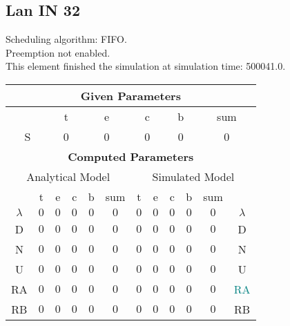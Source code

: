 \documentclass{article}
\begin{document}
\subsection{Lan IN 32}
Scheduling algorithm: FIFO.\\Preemption not enabled. \\This element finished the simulation at simulation time: 500041.0.\\
\begin{table}[H]\centering\begin{tabular}{@{}c|cccc|c||cccc|c|c@{}}\toprule\multicolumn{12}{c}{\textbf{Given Parameters}}\\\midrule\multicolumn{2}{c|}{ } & \multicolumn{2}{c}{t} & \multicolumn{2}{c}{e} & \multicolumn{2}{c}{c} & \multicolumn{2}{c}{b} & \multicolumn{2}{|c}{sum} \\ \midrule\multicolumn{2}{c|}{S} & \multicolumn{2}{c}{0} & \multicolumn{2}{c}{0} & \multicolumn{2}{c}{0} & \multicolumn{2}{c}{0} & \multicolumn{2}{|c}{0}\\ \midrule\midrule\multicolumn{12}{c}{\textbf{Computed Parameters}}\\ \midrule\multicolumn{6}{c||}{Analytical Model} & \multicolumn{6}{c}{Simulated Model}\\ 
 \midrule & t & e & c & b & sum & t & e & c & b & sum &  \\ \midrule$\lambda$ &$0$ & $0$ & $0$ & $0$ & $0$ & $0$ & $0$ & $0$ & $0$ & $0$& $\lambda$ \\D & $0$ & $0$ & $0$ & $0$ & $0$ & $0$ & $0$ & $0$ & $0$ & $0$& D\\N & $0$ & $0$ & $0$ & $0$ & $0$ & $0$ & $0$ & $0$ & $0$ & $0$& N\\U & $0$ & $0$ & $0$ & $0$ & $0$ & $0$ & $0$ & $0$ & $0$ & $0$& U\\RA & $0$ & $0$ & $0$ & $0$ & $0$ & $0$ & $0$ & $0$ & $0$ & $0$& \textcolor{teal}{RA}\\RB & $0$ & $0$ & $0$ & $0$ & $0$ & $0$ & $0$ & $0$ & $0$ & $0$& RB\\
\bottomrule
\end{tabular}
\end{table}
\filbreak
\end{document}
